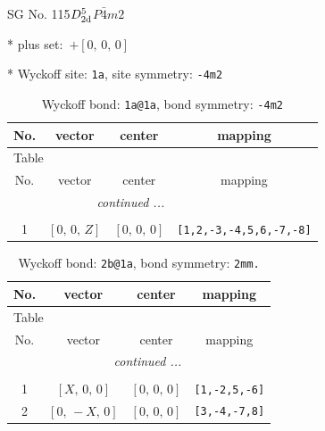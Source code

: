 \documentclass[fleqn,8pt]{jsarticle}
\begin{document}
\setcounter{MaxMatrixCols}{32}

\renewcommand{\tablename}{Table~}
\renewcommand{\figurename}{Figure~}
\begin{center}
\LARGE
SG No. 115\quad$D_{\rm 2d}^{5}$\quad$P\bar{4}m2$\quad[ tetragonal ]
\end{center}

* plus set:\,\,\,$+\left[ 0,\, 0,\, 0 \right]$


* Wyckoff site: {\tt 1a}, site symmetry: {\tt -4m2}
\renewcommand{\arraystretch}{1.2}
\begin{longtable}{cccc}
\caption{Wyckoff bond: {\tt 1a@1a}, bond symmetry: {\tt -4m2}}
 \\
 \hline \hline
No. & vector & center & mapping \\ \hline \endfirsthead

\multicolumn{3}{l}{\tablename\ \thetable{}} \\
 \hline \hline
No. & vector & center & mapping \\ \hline \endhead

 \hline \hline
\multicolumn{3}{r}{\footnotesize\it continued ...} \\ \endfoot

 \hline \hline
\multicolumn{3}{r}{} \\ \endlastfoot

1 & $\left[ 0,\, 0,\, Z \right]$ & $\left[ 0,\, 0,\, 0 \right]$ & {\tt [1,2,-3,-4,5,6,-7,-8]} \\
\end{longtable}
\renewcommand{\arraystretch}{1.2}
\begin{longtable}{cccc}
\caption{Wyckoff bond: {\tt 2b@1a}, bond symmetry: {\tt 2mm.}}
 \\
 \hline \hline
No. & vector & center & mapping \\ \hline \endfirsthead

\multicolumn{3}{l}{\tablename\ \thetable{}} \\
 \hline \hline
No. & vector & center & mapping \\ \hline \endhead

 \hline \hline
\multicolumn{3}{r}{\footnotesize\it continued ...} \\ \endfoot

 \hline \hline
\multicolumn{3}{r}{} \\ \endlastfoot

1 & $\left[ X,\, 0,\, 0 \right]$ & $\left[ 0,\, 0,\, 0 \right]$ & {\tt [1,-2,5,-6]} \\ \hline
2 & $\left[ 0,\, - X,\, 0 \right]$ & $\left[ 0,\, 0,\, 0 \right]$ & {\tt [3,-4,-7,8]} \\
\end{longtable}
\end{document}
